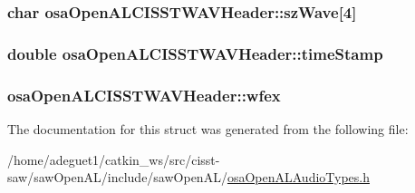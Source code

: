 \hypertarget{structosa_open_a_l_c_i_s_s_t_w_a_v_header_a02f2c36a22eb4d9724059cca34cedb29}{
\subsubsection[{sz\-Wave}]{\setlength{\rightskip}{0pt plus 5cm}char osa\-Open\-A\-L\-C\-I\-S\-S\-T\-W\-A\-V\-Header\-::sz\-Wave\mbox{[}4\mbox{]}}}\label{structosa_open_a_l_c_i_s_s_t_w_a_v_header_a02f2c36a22eb4d9724059cca34cedb29}
\hypertarget{structosa_open_a_l_c_i_s_s_t_w_a_v_header_a50e8ee3dcdfa333af1b637b6e4780924}{
\subsubsection[{time\-Stamp}]{\setlength{\rightskip}{0pt plus 5cm}double osa\-Open\-A\-L\-C\-I\-S\-S\-T\-W\-A\-V\-Header\-::time\-Stamp}}\label{structosa_open_a_l_c_i_s_s_t_w_a_v_header_a50e8ee3dcdfa333af1b637b6e4780924}
\hypertarget{structosa_open_a_l_c_i_s_s_t_w_a_v_header_a71f0f631b8d9cb27ef7aea0bc072e170}{
\subsubsection[{wfex}]{ osa\-Open\-A\-L\-C\-I\-S\-S\-T\-W\-A\-V\-Header\-::wfex}}\label{structosa_open_a_l_c_i_s_s_t_w_a_v_header_a71f0f631b8d9cb27ef7aea0bc072e170}


The documentation for this struct was generated from the following file\-:\begin{DoxyCompactItemize}
\item 
/home/adeguet1/catkin\-\_\-ws/src/cisst-\/saw/saw\-Open\-A\-L/include/saw\-Open\-A\-L/\hyperlink{osa_open_a_l_audio_types_8h}{osa\-Open\-A\-L\-Audio\-Types.\-h}\end{DoxyCompactItemize}
